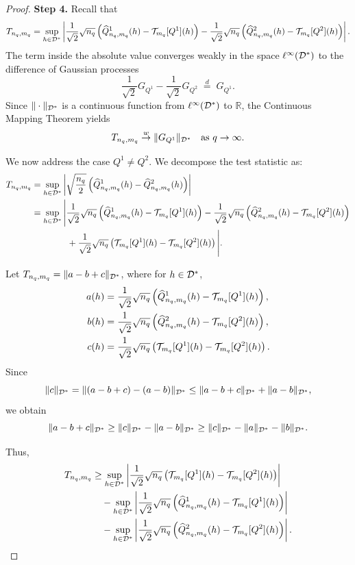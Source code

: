 \begin{proof}
\textbf{Step 4.}
Recall that
\[
T_{n_q,m_q}
= \sup_{h \in \mathcal{D}^*} \left| \frac{1}{\sqrt{2}}\sqrt{n_q}\left(\widehat{Q}^1_{n_q,m_q}(h) - \mathcal{T}_{m_q}[Q^1](h) \right)
- \frac{1}{\sqrt{2}}\sqrt{n_q} \left(\widehat{Q}^2_{n_q,m_q}(h) - \mathcal{T}_{m_q}[Q^2](h) \right)\right|.
\]
The term inside the absolute value converges weakly in the space $\ell^\infty(\mathcal{D}^*)$ to the difference of Gaussian processes
\[
\frac{1}{\sqrt{2}}G_{Q^1} - \frac{1}{\sqrt{2}}G_{Q^2}
\;\overset{d}{=}\;
G_{Q^1}.
\]
Since $\|\cdot\|_{\mathcal{D}^*}$ is a continuous function from $\ell^\infty(\mathcal{D}^*)$ to $\mathbb{R}$, the Continuous Mapping Theorem yields
\[
T_{n_q,m_q} \overset{w}{\to} \|G_{Q^1}\|_{\mathcal{D}^*}
\quad \text{as } q \to \infty.
\]

We now address the case $Q^1 \neq Q^2$. We decompose the test statistic as:
\begin{align*}
T_{n_q,m_q}
&= \sup_{h \in \mathcal{D}^*}\left| \sqrt{\frac{n_q}{2}} \left(\widehat{Q}^1_{n_q,m_q}(h) - \widehat{Q}^2_{n_q,m_q}(h) \right)\right| \\
&= \sup_{h \in \mathcal{D}^*} \Bigg|
\frac{1}{\sqrt{2}}\sqrt{n_q}\left(\widehat{Q}^1_{n_q,m_q}(h) - \mathcal{T}_{m_q}[Q^1](h) \right)
- \frac{1}{\sqrt{2}}\sqrt{n_q} \left(\widehat{Q}^2_{n_q,m_q}(h) - \mathcal{T}_{m_q}[Q^2](h) \right) \\
& \qquad\qquad
+ \frac{1}{\sqrt{2}}\sqrt{n_q} \left(\mathcal{T}_{m_q}[Q^1](h) - \mathcal{T}_{m_q}[Q^2](h) \right)
\Bigg|.
\end{align*}

Let $T_{n_q,m_q} = \|a - b + c\|_{\mathcal{D}^*}$, where for $h \in \mathcal{D}^*$,
\begin{align*}
a(h) &= \frac{1}{\sqrt{2}}\sqrt{n_q}\left(\widehat{Q}^1_{n_q,m_q}(h) - \mathcal{T}_{m_q}[Q^1](h) \right),\\
b(h) &= \frac{1}{\sqrt{2}}\sqrt{n_q}\left(\widehat{Q}^2_{n_q,m_q}(h) - \mathcal{T}_{m_q}[Q^2](h) \right),\\
c(h) &= \frac{1}{\sqrt{2}}\sqrt{n_q} \left(\mathcal{T}_{m_q}[Q^1](h) - \mathcal{T}_{m_q}[Q^2](h) \right).
\end{align*}
Since
\[
\|c\|_{\mathcal{D}^*}
= \|(a - b + c) - (a - b)\|_{\mathcal{D}^*}
\leq \|a - b + c\|_{\mathcal{D}^*} + \|a - b\|_{\mathcal{D}^*},
\]
we obtain
\[
\|a - b + c\|_{\mathcal{D}^*}
\geq \|c\|_{\mathcal{D}^*} - \|a - b\|_{\mathcal{D}^*}
\geq \|c\|_{\mathcal{D}^*} - \|a\|_{\mathcal{D}^*} - \|b\|_{\mathcal{D}^*}.
\]

Thus,
\begin{align*}
T_{n_q,m_q}
&\geq \sup_{h \in \mathcal{D}^*} \left| \frac{1}{\sqrt{2}}\sqrt{n_q} \left(\mathcal{T}_{m_q}[Q^1](h) - \mathcal{T}_{m_q}[Q^2](h) \right)\right| \\
&\quad - \sup_{h\in \mathcal{D}^*} \left| \frac{1}{\sqrt{2}}\sqrt{n_q}\left(\widehat{Q}^1_{n_q,m_q}(h) - \mathcal{T}_{m_q}[Q^1](h) \right)\right| \\
&\quad - \sup_{h\in \mathcal{D}^*} \left| \frac{1}{\sqrt{2}}\sqrt{n_q} \left(\widehat{Q}^2_{n_q,m_q}(h) - \mathcal{T}_{m_q}[Q^2](h) \right)\right|.
\end{align*}


\end{proof}
